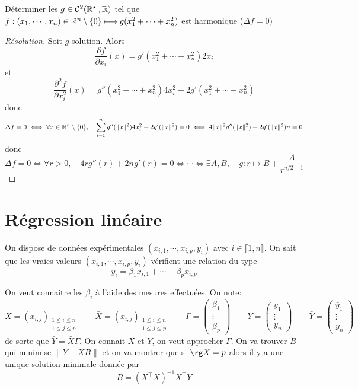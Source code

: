 \begin{exo}
    Déterminer les $g\in\mathcal C^2(\mathbb R_+^\star, \mathbb R)$ tel que $f:(x_1, \cdots, x_n)\in\mathbb R^n\setminus \{0\}\longmapsto g(x_1^2+ \cdots+ x_n^2)$ est harmonique ($\Delta f=0$)
\end{exo}

\begin{proof}[Résolution]
    Soit $g$ solution. Alors \[
        \frac{\partial f}{\partial x_i}(x)=g'(x_1^2+\cdots+x_n^2) 2x_i
    \]
    et \[
        \frac{\partial ^2 f}{\partial x_i^2}(x)=g''(x_1^2+\cdots+x_n^2)4x_i^2+2g'(x_1^2+\cdots +x_n^2) 
    \]
    donc \[
        \Delta f=0\iff \forall x\in\mathbb R^n\setminus \{0\}, \quad \sum_{i=1}^ng''(\|x\|^2)4x_i^2+2g'(\|x\|^2)=0 \iff 4\|x\|^2g''(\|x\|^2)+2g'(\|x\|^2)n=0
    \]
    donc \[
        \Delta f=0\iff \forall r>0, \quad 4rg''(r)+2ng'(r)=0\iff \cdots \iff \exists A, B, \quad g:r\longmapsto B+\frac{A}{r^{n/2-1}}
    \]
\end{proof}

\section{Régression linéaire}

On dispose de données expérimentales $(x_{i, 1}, \cdots, x_{i, p}, y_i)$ avec $i\in\llbracket 1, n\rrbracket$. On sait que les vraies valeurs $(\bar x_{i, 1}, \cdots, \bar x_{i, p}, \bar y_i)$ vérifient une relation du type \[
    \bar y_i=\beta_1\bar x_{i, 1}+\cdots+\beta_p\bar x_{i, p}
\]

On veut connaitre les $\beta_i$ à l'aide des mesures effectuées. On note: \[
    X=(x_{i, j})_{\substack{1\leq i\leq n\\ 1\leq j\leq p}} \qquad \bar X=(\bar x_{i, j})_{\substack{1\leq i\leq n\\ 1\leq j\leq p}} \qquad \Gamma= \begin{pmatrix}
        \beta_1\\ \vdots\\\beta_p
    \end{pmatrix} \qquad Y= \begin{pmatrix}
        y_1\\\vdots\\ y_n
    \end{pmatrix}\qquad \bar Y= \begin{pmatrix}
        \bar y_1\\\vdots\\ \bar y_n
    \end{pmatrix}
\]
de sorte que $\bar Y=\bar X\Gamma$. On connait $X$ et $Y$, on veut approcher $\Gamma$. On va trouver $B$ qui minimise $\|Y-XB\|$ et on va montrer que si $\rg X=p$ alors il y a une unique solution minimale donnée par \[
    B=(X^\top X)^{-1}X^\top Y
\]


